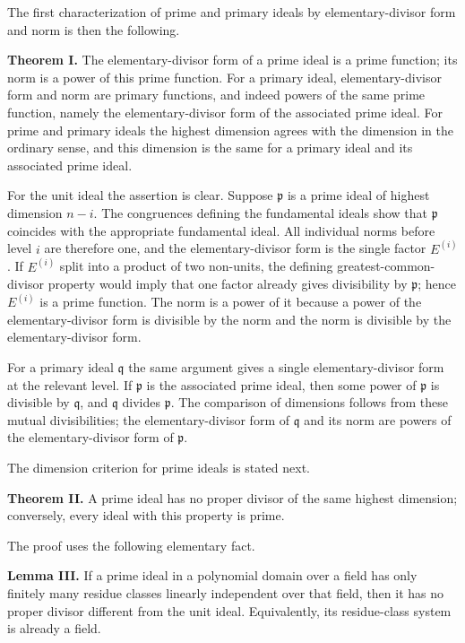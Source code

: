 \documentclass[12pt]{article}
\begin{document}
The first characterization of prime and primary ideals by elementary-divisor form and norm is then the following.

\textbf{Theorem I.} The elementary-divisor form of a prime ideal is a prime function; its norm is a power of this prime function. For a primary ideal, elementary-divisor form and norm are primary functions, and indeed powers of the same prime function, namely the elementary-divisor form of the associated prime ideal. For prime and primary ideals the highest dimension agrees with the dimension in the ordinary sense, and this dimension is the same for a primary ideal and its associated prime ideal.

For the unit ideal the assertion is clear. Suppose $\mathfrak p$ is a prime ideal of highest dimension $n-i$. The congruences defining the fundamental ideals show that $\mathfrak p$ coincides with the appropriate fundamental ideal. All individual norms before level $i$ are therefore one, and the elementary-divisor form is the single factor $E^{(i)}$. If $E^{(i)}$ split into a product of two non-units, the defining greatest-common-divisor property would imply that one factor already gives divisibility by $\mathfrak p$; hence $E^{(i)}$ is a prime function. The norm is a power of it because a power of the elementary-divisor form is divisible by the norm and the norm is divisible by the elementary-divisor form.

For a primary ideal $\mathfrak q$ the same argument gives a single elementary-divisor form at the relevant level. If $\mathfrak p$ is the associated prime ideal, then some power of $\mathfrak p$ is divisible by $\mathfrak q$, and $\mathfrak q$ divides $\mathfrak p$. The comparison of dimensions follows from these mutual divisibilities; the elementary-divisor form of $\mathfrak q$ and its norm are powers of the elementary-divisor form of $\mathfrak p$.

The dimension criterion for prime ideals is stated next.

\textbf{Theorem II.} A prime ideal has no proper divisor of the same highest dimension; conversely, every ideal with this property is prime.

The proof uses the following elementary fact.

\textbf{Lemma III.} If a prime ideal in a polynomial domain over a field has only finitely many residue classes linearly independent over that field, then it has no proper divisor different from the unit ideal. Equivalently, its residue-class system is already a field.
\end{document}
